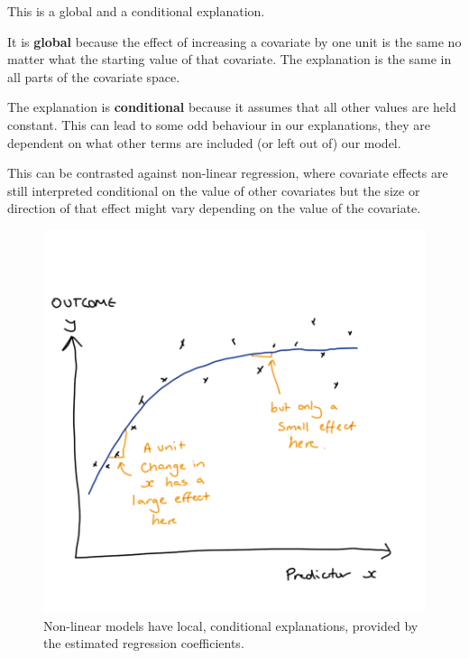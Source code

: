 \documentclass[
  12pt,
]{book}
\begin{document}
This is a global and a conditional explanation.

It is \textbf{global} because the effect of increasing a covariate by one unit is the same no matter what the starting value of that covariate. The explanation is the same in all parts of the covariate space.

The explanation is \textbf{conditional} because it assumes that all other values are held constant. This can lead to some odd behaviour in our explanations, they are dependent on what other terms are included (or left out of) our model.

This can be contrasted against non-linear regression, where covariate effects are still interpreted conditional on the value of other covariates but the size or direction of that effect might vary depending on the value of the covariate.

\begin{figure}

{\centering \includegraphics[width=12.5in]{images/402-production-explainability/interpreting-nonlinear-regression} 

}

\caption{Non-linear models have local, conditional explanations, provided by the estimated regression coefficients.}\label{fig:unnamed-chunk-4}
\end{figure}
\end{document}
